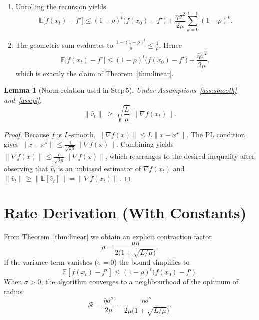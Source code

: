 \documentclass{article}
\newtheorem{lemma}{Lemma}[section]
\begin{document}
\begin{enumerate}
\item[Step 8.] Unrolling the recursion yields
\[
\mathbb{E}\!\bigl[f(x_{t})-f^\star\bigr]
\le (1-\rho)^{t}\bigl(f(x_{0})-f^\star\bigr)
   +\frac{\bar\eta\sigma^{2}}{2\mu}\sum_{k=0}^{t-1}(1-\rho)^{k}.
\tag{8}
\]

\item[Step 9.] The geometric sum evaluates to $\frac{1-(1-\rho)^{t}}{\rho}\le
\frac{1}{\rho}$.  Hence
\[
\mathbb{E}\!\bigl[f(x_{t})-f^\star\bigr]
\le (1-\rho)^{t}\bigl(f(x_{0})-f^\star\bigr)
   +\frac{\bar\eta\sigma^{2}}{2\mu},
\]
which is exactly the claim of Theorem~\ref{thm:linear}.
\end{enumerate}

\begin{lemma}[Norm relation used in Step 5]\label{lem:normrel}
Under Assumptions~\ref{ass:smooth} and~\ref{ass:pl},
\[
\|\hat v_t\|
\;\ge\;
\sqrt{\frac{L}{\mu}}\;\|\nabla f(x_t)\|.
\]
\end{lemma}
\begin{proof}
Because $f$ is $L$‑smooth,
$\|\nabla f(x)\|\le L\|x-x^\star\|$.
The PL condition gives $\|x-x^\star\|\le \frac{1}{\sqrt{2\mu}}
\|\nabla f(x)\|$.  Combining yields
$\|\nabla f(x)\|\le \frac{L}{\sqrt{2\mu}}\|\nabla f(x)\|$,
which rearranges to the desired inequality after observing that
$\hat v_t$ is an unbiased estimator of $\nabla f(x_t)$ and
$\|\hat v_t\|\ge\|\mathbb{E}[\hat v_t]\|=\|\nabla f(x_t)\|$.
\end{proof}

\section*{Rate Derivation (With Constants)}
From Theorem~\ref{thm:linear} we obtain an explicit contraction factor
\[
\rho = \frac{\mu\eta}{2\bigl(1+\sqrt{L/\mu}\bigr)} .
\]
If the variance term vanishes ($\sigma=0$) the bound simplifies to
\[
\mathbb{E}[f(x_t)-f^\star]\le (1-\rho)^{t}\bigl(f(x_0)-f^\star\bigr).
\]
When $\sigma>0$, the algorithm converges to a neighbourhood of the optimum
of radius
\[
\mathcal{R}= \frac{\bar\eta\sigma^{2}}{2\mu}
          = \frac{\eta\sigma^{2}}{2\mu\bigl(1+\sqrt{L/\mu}\bigr)} .
\]

\end{document}
